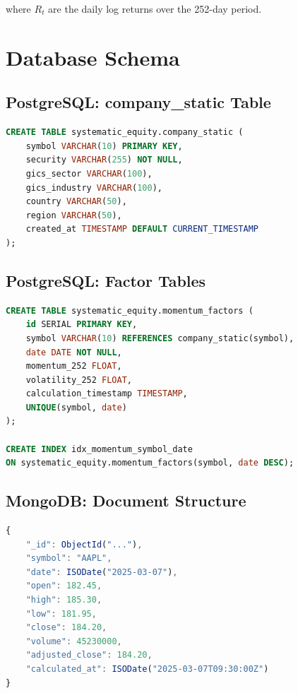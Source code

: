 \documentclass[11pt, a4paper, twoside]{article}
\begin{document}
where $R_t$ are the daily log returns over the 252-day period.

\section{Database Schema}
\label{app:schema}

\subsection{PostgreSQL: company\_static Table}

\begin{lstlisting}[language=SQL, caption=Company Static Data Schema]
CREATE TABLE systematic_equity.company_static (
    symbol VARCHAR(10) PRIMARY KEY,
    security VARCHAR(255) NOT NULL,
    gics_sector VARCHAR(100),
    gics_industry VARCHAR(100),
    country VARCHAR(50),
    region VARCHAR(50),
    created_at TIMESTAMP DEFAULT CURRENT_TIMESTAMP
);
\end{lstlisting}

\subsection{PostgreSQL: Factor Tables}

\begin{lstlisting}[language=SQL, caption=Momentum Factors Schema]
CREATE TABLE systematic_equity.momentum_factors (
    id SERIAL PRIMARY KEY,
    symbol VARCHAR(10) REFERENCES company_static(symbol),
    date DATE NOT NULL,
    momentum_252 FLOAT,
    volatility_252 FLOAT,
    calculation_timestamp TIMESTAMP,
    UNIQUE(symbol, date)
);

CREATE INDEX idx_momentum_symbol_date 
ON systematic_equity.momentum_factors(symbol, date DESC);
\end{lstlisting}

\subsection{MongoDB: Document Structure}

\begin{lstlisting}[language=JavaScript, caption=MongoDB Price History Document]
{
    "_id": ObjectId("..."),
    "symbol": "AAPL",
    "date": ISODate("2025-03-07"),
    "open": 182.45,
    "high": 185.30,
    "low": 181.95,
    "close": 184.20,
    "volume": 45230000,
    "adjusted_close": 184.20,
    "calculated_at": ISODate("2025-03-07T09:30:00Z")
}
\end{lstlisting}
\end{document}
